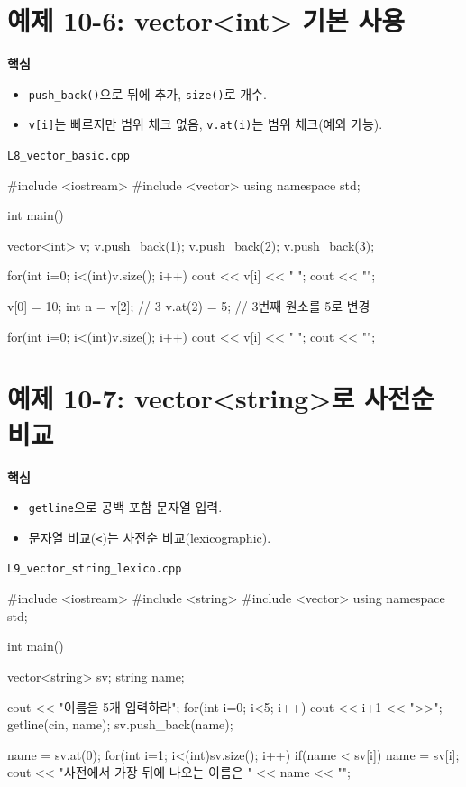\documentclass[11pt,a4paper]{article}
\newcommand{\filetag}[1]{\texttt{\color{Accent}#1}}
\begin{document}
\section{예제 10-6: vector<int> 기본 사용}
\begin{GoalBox}
\textbf{핵심}
\begin{itemize}[leftmargin=18pt]
  \item \texttt{push\_back()}으로 뒤에 추가, \texttt{size()}로 개수.
  \item \texttt{v[i]}는 빠르지만 범위 체크 없음, \texttt{v.at(i)}는 범위 체크(예외 가능).
\end{itemize}
\end{GoalBox}

\noindent\filetag{L8\_vector\_basic.cpp}
\begin{cppcode}
#include <iostream>
#include <vector>
using namespace std;

int main() {
    vector<int> v;
    v.push_back(1);
    v.push_back(2);
    v.push_back(3);

    for(int i=0; i<(int)v.size(); i++)
        cout << v[i] << " ";
    cout << "\n";

    v[0] = 10;
    int n = v[2];     // 3
    v.at(2) = 5;      // 3번째 원소를 5로 변경

    for(int i=0; i<(int)v.size(); i++)
        cout << v[i] << " ";
    cout << "\n";
}
\end{cppcode}

\section{예제 10-7: vector<string>로 사전순 비교}
\begin{GoalBox}
\textbf{핵심}
\begin{itemize}[leftmargin=18pt]
  \item \texttt{getline}으로 공백 포함 문자열 입력.
  \item 문자열 비교(\texttt{<})는 사전순 비교(lexicographic).
\end{itemize}
\end{GoalBox}

\noindent\filetag{L9\_vector\_string\_lexico.cpp}
\begin{cppcode}
#include <iostream>
#include <string>
#include <vector>
using namespace std;

int main() {
    vector<string> sv;
    string name;

    cout << "이름을 5개 입력하라\n";
    for(int i=0; i<5; i++) {
        cout << i+1 << ">>";
        getline(cin, name);
        sv.push_back(name);
    }

    name = sv.at(0);
    for(int i=1; i<(int)sv.size(); i++) {
        if(name < sv[i]) name = sv[i];
    }
    cout << "사전에서 가장 뒤에 나오는 이름은 " << name << "\n";
}
\end{cppcode}
\end{document}
